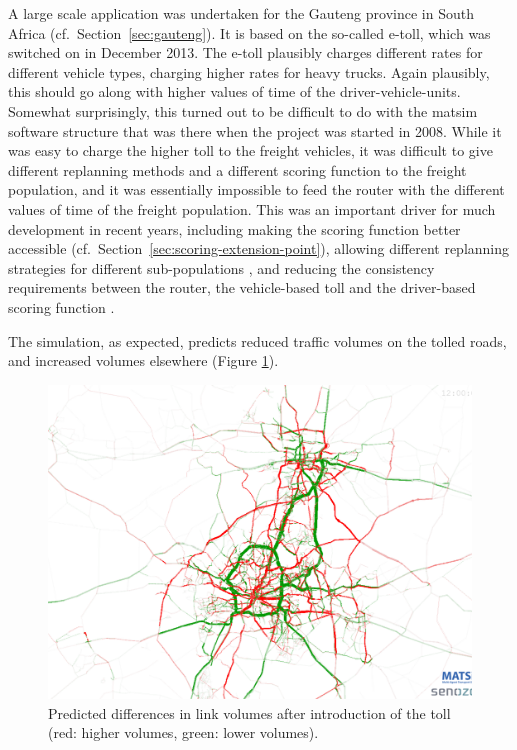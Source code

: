 A large scale application was undertaken for the Gauteng province in South Africa (cf.\ Section~\ref{sec:gauteng}).  It is based on the so-called e-toll, which was switched on in December 2013.  The e-toll plausibly charges different rates for different vehicle types, charging higher rates for heavy trucks.  Again plausibly, this should go along with higher values of time of the driver-vehicle-units.  Somewhat surprisingly, this turned out to be difficult to do with the \acrshort{matsim} software structure that was there when the project was started in 2008.  While it was easy to charge the higher toll to the freight vehicles, it was difficult to give different replanning methods and a different scoring function to the freight population, and it was essentially impossible to feed the router with the different values of time of the freight population.  This was an important driver for much development in recent years, including making the scoring function better accessible (cf.\ Section~\ref{sec:scoring-extension-point}), allowing different replanning strategies for different sub-populations , and reducing the consistency requirements between the router, the vehicle-based toll and the driver-based scoring function \citep{NagelEtAl_PCS_2014}.

The simulation, as expected, predicts reduced traffic volumes on the tolled roads, and increased volumes elsewhere (Figure \ref{fig:gauteng-toll-volumes}).


\begin{figure}
  \centerline{%
\includegraphics[width=0.8\hsize,trim=0 0 0 0,clip]{extending/figures/roadpricing/abs-diff-link-vol-vot55-24h.png}
}
  \caption{ Predicted differences in link volumes after introduction of the toll (red: higher volumes, green: lower volumes).}
  \label{fig:gauteng-toll-volumes}
\end{figure}

